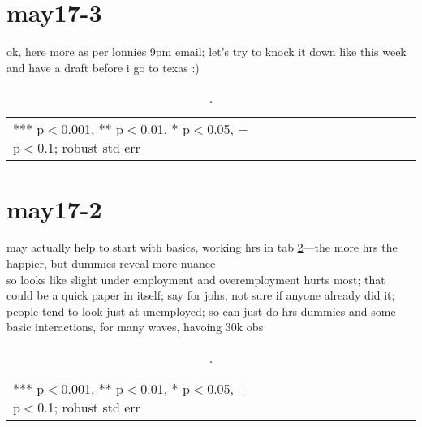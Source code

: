 \documentclass[10pt, letterpaper]{article}
\begin{document}
\begin{spacing}{1.4}
\section{may17-3}
ok, here more as per lonnies 9pm email; let's try to knock it down like this
week and have a draft before i go to texas :)\\



\begin{spacing}{.9}
  \begin{table}[H]\centering \caption{.} \label{z1} \begin{scriptsize} \begin{tabular}{p{1.8in}p{.5in}p{.5in}p{.5in}p{.5in}p{.5in}p{.5in}p{.5in}p{.5in}p{.5in}p{.5
            in}p{.5in}p{.5 in}}\hline
        
\hline  *** p$<$0.001, ** p$<$0.01, * p$<$0.05, $+$ p$<$0.1; robust std err
         \end{tabular}\end{scriptsize}\end{table}
\end{spacing}



\section{may17-2}


may actually help to start with basics, working hrs in tab \ref{t1}---the more
hrs the happier, but dummies reveal more nuance\\

so looks like slight under employment and overemployment hurts most; that could
be a quick paper in itself; say for johs, not sure if anyone already did it;
people tend to look just at unemployed; so can just do hrs dummies and some
basic interactions, for many waves, havoing 30k obs



\begin{spacing}{.9}
  \begin{table}[H]\centering \caption{.} \label{t1} \begin{scriptsize} \begin{tabular}{p{1.8in}p{.5in}p{.5in}p{.5in}p{.5in}p{.5in}p{.5in}p{.5in}p{.5in}p{.5in}p{.5
            in}p{.5in}p{.5 in}}\hline
        
\hline  *** p$<$0.001, ** p$<$0.01, * p$<$0.05, $+$ p$<$0.1; robust std err
         \end{tabular}\end{scriptsize}\end{table}
\end{spacing}


\end{spacing}
\end{document}
